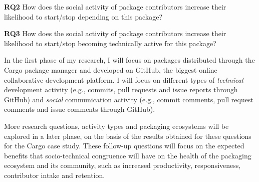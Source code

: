 \noindent \textbf{RQ2} How does the social activity of package contributors increase their likelihood to start/stop depending on this package?

\noindent \textbf{RQ3} How does the social activity of package contributors increase their likelihood to start/stop becoming technically active for this package?


In the first phase of my research, I will focus on packages distributed through the Cargo package manager and developed on GitHub, the biggest online collaborative development platform.
%
I will focus on different types of \emph{technical} development activity (e.g., commits, pull requests and issue reports through GitHub) and \emph{social} communication activity (e.g., commit comments, pull request comments and issue comments through GitHub). 

More research questions, activity types and packaging ecosystems will be explored in a later phase, on the basis of the results obtained for these questions for the Cargo case study. These follow-up questions will focus on the expected benefits that socio-technical congruence will have on the health of the packaging ecosystem and its community, such as increased productivity, responsiveness, contributor intake and retention.